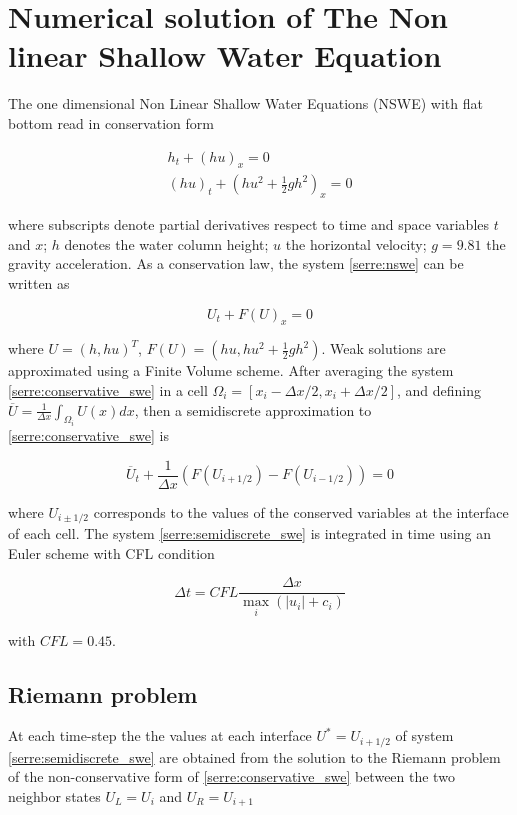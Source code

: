 \section{Numerical solution of The Non linear Shallow Water Equation}
 The one dimensional Non Linear Shallow Water Equations (NSWE) with flat bottom read in conservation form

\begin{equation}
	\begin{split}
		h_t + ( hu)_x = 0\\
		(hu)_t + \left( hu^2 + \frac{1}{2}gh^2 \right)_x = 0 
	\end{split}
	\label{serre:nswe}
\end{equation}

 where subscripts denote partial derivatives respect to time and space variables $t$ and $x$; $h$ denotes the water column height; $u$ the horizontal velocity; $g=9.81$ the gravity acceleration. As a conservation law, the system \eqref{serre:nswe} can be written as

\begin{equation}
	U_t + F(U)_x = 0
	\label{serre:conservative_swe}
\end{equation}

 where $U=(h,hu)^T$, $F(U) = (hu, hu^2 + \frac{1}{2}gh^2)$. Weak solutions are approximated using a Finite Volume scheme. After averaging the system \eqref{serre:conservative_swe} in a cell $\Omega_i = [x_i-\Delta x/2, x_i+\Delta x/2]$, and defining $ \overline U = \frac{1}{\Delta x} \int_{\Omega_i} U(x)dx$, then a semidiscrete approximation to \eqref{serre:conservative_swe} is 

\begin{equation}
	\overline U _t + \frac{1}{\Delta x}\left( F(U_{i+1/2}) - F(U_{i-1/2}) \right) = 0
	\label{serre:semidiscrete_swe}
\end{equation}

 where $U_{i\pm1/2}$ corresponds to the values of the conserved variables at the interface of each cell. The system \eqref{serre:semidiscrete_swe} is integrated in time using an Euler scheme with CFL condition

\begin{equation}
	\Delta t = CFL \frac{\Delta x}{\max_i(|u_i|+c_i)}
\end{equation}

with $CFL=0.45$.

\subsection{Riemann problem}
At each time-step the the values at each interface $U^* = U_{i+1/2}$ of system \eqref{serre:semidiscrete_swe} are obtained from the solution to the Riemann problem of the non-conservative form of \eqref{serre:conservative_swe} between the two neighbor states $U_L = U_i$ and $U_R = U_{i+1}$

